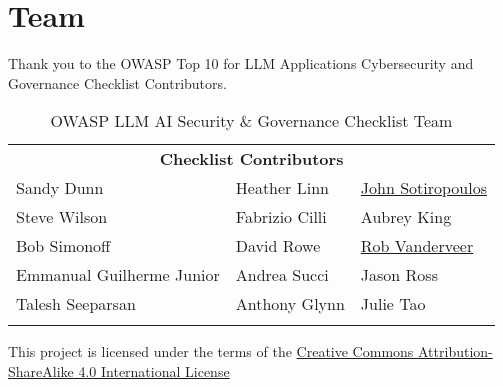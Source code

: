 

\headerimage
\chapter{Team}

Thank you to the OWASP Top 10 for LLM Applications Cybersecurity and Governance
Checklist Contributors.

\setlength\LTleft{0pt}
\setlength\LTright{0pt}
\begin{longtable}[c]{|p{}|p{}|p{}|}
  \hline
  \rowcolor{owasplightpurple}
  \multicolumn{3}{|c|}{
    \textbf{Checklist Contributors}
  } \\
  \hline
  \endfirsthead
  \hline
  \multicolumn{3}{|c|}{
    \textbf{Checklist Contributors}
  } \\
  \hline
  \endhead
  \endfoot
\hline
  Sandy Dunn & Heather Linn & \href{mailto:john.sotiropoulos@kainos.com}{John Sotiropoulos}   \\
  \hline
  Steve Wilson & Fabrizio Cilli & Aubrey King     \\
  \hline
  Bob Simonoff & David Rowe & \href{mailto:r.vanderveer@sig.eu}{Rob Vanderveer}      \\
  \hline
  Emmanual Guilherme Junior & Andrea Succi & Jason Ross \\
  \hline
  Talesh Seeparsan & Anthony Glynn & Julie Tao \\
  \hline
  \caption{OWASP LLM AI Security \& Governance Checklist Team}
  \label{tab:team}
\end{longtable}

This project is licensed under the terms of the
\href{https://creativecommons.org/licenses/by-sa/4.0/}{Creative Commons Attribution-ShareAlike 4.0 International License}